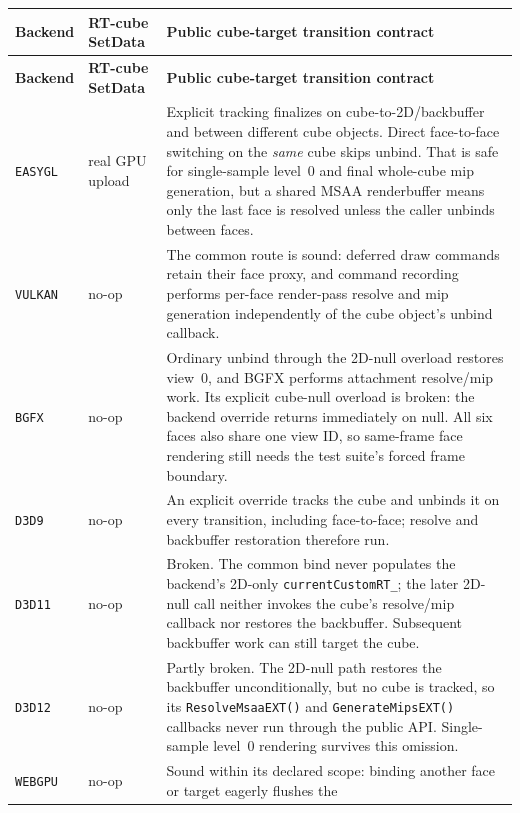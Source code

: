 \begingroup
\small
\setlength{\tabcolsep}{4pt}
\renewcommand{\arraystretch}{1.15}
\begin{longtable}{@{}p{}p{}p{}@{}}
\toprule
\textbf{Backend} & \textbf{RT-cube SetData} & \textbf{Public cube-target transition contract} \\
\midrule
\endfirsthead
\toprule
\textbf{Backend} & \textbf{RT-cube SetData} & \textbf{Public cube-target transition contract} \\
\midrule
\endhead
\texttt{EASYGL}
  & real GPU upload & Explicit tracking finalizes on cube-to-2D/backbuffer and between different
    cube objects. Direct face-to-face switching on the \emph{same} cube skips unbind. That is
    safe for single-sample level~0 and final whole-cube mip generation, but a shared MSAA
    renderbuffer means only the last face is resolved unless the caller unbinds between faces. \\
\texttt{VULKAN}
  & no-op & The common route is sound: deferred draw commands retain their face proxy, and
    command recording performs per-face render-pass resolve and mip generation independently
    of the cube object's unbind callback. \\
\texttt{BGFX}
  & no-op & Ordinary unbind through the 2D-null overload restores view~0, and BGFX performs
    attachment resolve/mip work. Its explicit cube-null overload is broken: the backend override
    returns immediately on null. All six faces also share one view ID, so same-frame face
    rendering still needs the test suite's forced frame boundary. \\
\texttt{D3D9}
  & no-op & An explicit override tracks the cube and unbinds it on every transition, including
    face-to-face; resolve and backbuffer restoration therefore run. \\
\texttt{D3D11}
  & no-op & Broken. The common bind never populates the backend's 2D-only
    \texttt{currentCustomRT\_}; the later 2D-null call neither invokes the cube's resolve/mip
    callback nor restores the backbuffer. Subsequent backbuffer work can still target the cube. \\
\texttt{D3D12}
  & no-op & Partly broken. The 2D-null path restores the backbuffer unconditionally, but no cube
    is tracked, so its \texttt{ResolveMsaaEXT()} and \texttt{GenerateMipsEXT()} callbacks never
    run through the public API. Single-sample level~0 rendering survives this omission. \\
\texttt{WEBGPU}
  & no-op & Sound within its declared scope: binding another face or target eagerly flushes the

\end{longtable}
